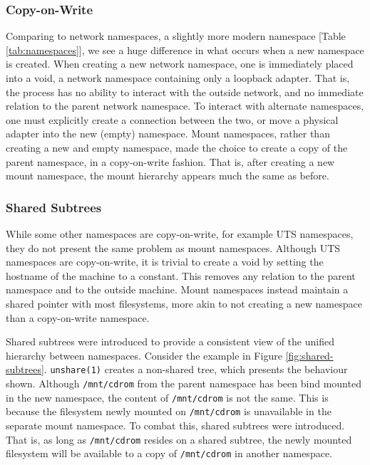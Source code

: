\documentclass[sigplan]{acmart}
\begin{document}
\subsubsection{Copy-on-Write}

Comparing to network namespaces, a slightly more modern namespace [Table \ref{tab:namespaces}], we see a huge difference in what occurs when a new namespace is created. When creating a new network namespace, one is immediately placed into a void, a network namespace containing only a loopback adapter. That is, the process has no ability to interact with the outside network, and no immediate relation to the parent network namespace. To interact with alternate namespaces, one must explicitly create a connection between the two, or move a physical adapter into the new (empty) namespace. Mount namespaces, rather than creating a new and empty namespace, made the choice to create a copy of the parent namespace, in a copy-on-write fashion. That is, after creating a new mount namespace, the mount hierarchy appears much the same as before.

\subsubsection{Shared Subtrees}
\label{sec:shared-subtrees}

While some other namespaces are copy-on-write, for example UTS namespaces, they do not present the same problem as mount namespaces. Although UTS namespaces are copy-on-write, it is trivial to create a void by setting the hostname of the machine to a constant. This removes any relation to the parent namespace and to the outside machine. Mount namespaces instead maintain a shared pointer with most filesystems, more akin to not creating a new namespace than a copy-on-write namespace.

Shared subtrees \citep{pai_shared_2005} were introduced to provide a consistent view of the unified hierarchy between namespaces. Consider the example in Figure \ref{fig:shared-subtrees}. \texttt{unshare(1)} creates a non-shared tree, which presents the behaviour shown. Although \texttt{/mnt/cdrom} from the parent namespace has been bind mounted in the new namespace, the content of \texttt{/mnt/cdrom} is not the same. This is because the filesystem newly mounted on \texttt{/mnt/cdrom} is unavailable in the separate mount namespace. To combat this, shared subtrees were introduced. That is, as long as \texttt{/mnt/cdrom} resides on a shared subtree, the newly mounted filesystem will be available to a copy of \texttt{/mnt/cdrom} in another namespace.
\end{document}
